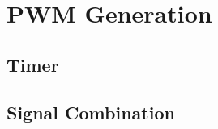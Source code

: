 \setchapterpreamble[u]{\margintoc}

\chapter{PWM Generation}

\section{Timer}

\section{Signal Combination}